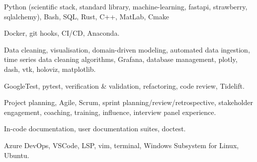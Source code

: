 \documentclass[8pt]{developercv}
\begin{document}
\begin{entrylist}
	{
		Python (scientific stack, standard library, machine-learning, fastapi,
		strawberry, sqlalchemy), Bash, SQL, Rust, C++, MatLab, Cmake
	}

	{
		Docker, git hooks, CI/CD, Anaconda.
	}

	{
		Data cleaning, visualisation, domain-driven modeling, automated data
		ingestion, time series data cleaning algorithms, Grafana, database
		management, plotly, dash, vtk, holoviz, matplotlib.
	}

	{
		GoogleTest, pytest, verification \& validation, refactoring, code
		review, Tidelift.
	}

	{
		Project planning, Agile, Scrum, sprint planning/review/retrospective,
		stakeholder engagement, coaching, training, influence, interview panel
		experience.
	}

	{
		In-code documentation, user documentation suites, doctest.
	}

	{
		Azure DevOps, VSCode, LSP, vim, terminal, Windows Subsystem for Linux,
		Ubuntu.
	}

\end{entrylist}

\end{document}
